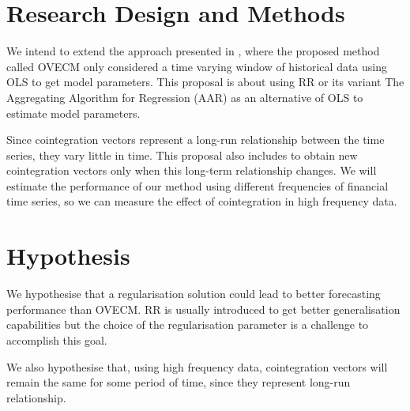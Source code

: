 \documentclass[12pt,reqno]{amsart}
\begin{document}
\section{Research Design and Methods}
We intend to extend the approach presented in \cite{icpram15}, where the proposed method called OVECM only considered a time varying window of historical data using OLS to
get model parameters. This proposal is about using RR or its variant  The  Aggregating Algorithm for Regression (AAR)  \cite{vovk2001} as an alternative of OLS to estimate model parameters.

Since cointegration vectors represent a long-run relationship between the time
series, they vary little in time. This proposal also includes to obtain new
cointegration vectors only when this long-term relationship changes.
We will estimate the performance of our method using different frequencies of financial time series, so we can measure the effect of cointegration in high frequency data.

\section{Hypothesis}

We hypothesise that a regularisation solution could lead to better forecasting performance than OVECM. RR is usually introduced to get better generalisation capabilities but the choice of the regularisation parameter is a challenge to accomplish this goal.

We also hypothesise that, using high frequency data, cointegration vectors will remain the same for some period of time, since they represent long-run relationship.





\end{document}
